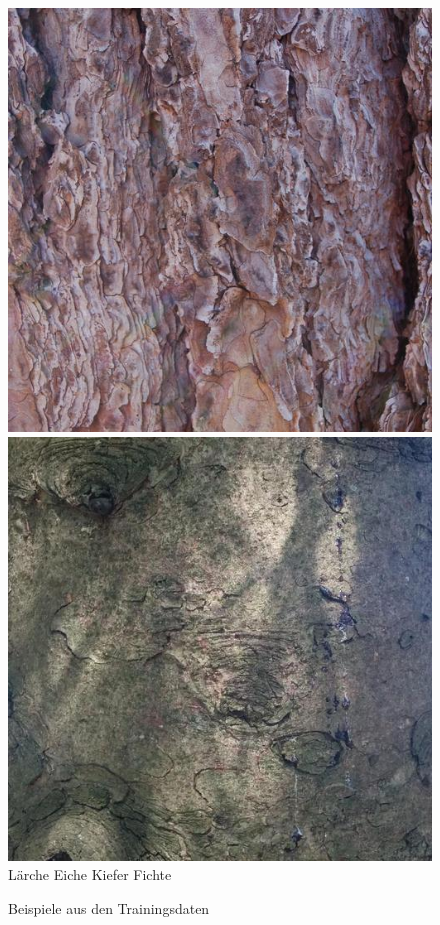 \documentclass{article}
\begin{document}
\begin{figure}[h!]
  \includegraphics[width=0.24\linewidth]{examples/train/Pine}
  \includegraphics[width=0.24\linewidth]{examples/train/Spruce}
  Lärche \hspace{70pt} Eiche \hspace{70pt} Kiefer \hspace{70pt} Fichte\\
  \caption{Beispiele aus den Trainingsdaten}
  \label{train}
\end{figure}
\end{document}
